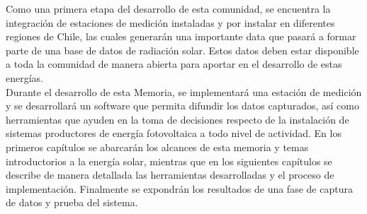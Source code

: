 Como una primera etapa del desarrollo de esta comunidad, se encuentra la integración de estaciones de medición instaladas y por instalar en diferentes regiones de Chile, las cuales generarán una importante data que pasará a formar parte de una base de datos de radiación solar. Estos datos deben estar disponible a toda la comunidad de manera abierta para aportar en el desarrollo de estas energías.\\

Durante el desarrollo de esta Memoria, se implementará una estación de medición y se desarrollará un software que permita difundir los datos capturados, así como herramientas que ayuden en la toma de decisiones respecto de la instalación de sistemas productores de energía fotovoltaica a todo nivel de actividad. En los primeros capítulos se abarcarán los alcances de esta memoria y temas introductorios a la energía solar, mientras que en los siguientes capítulos se describe de manera detallada las herramientas desarrolladas y el proceso de implementación. Finalmente se expondrán los resultados de una fase de captura de datos y prueba del sistema.
